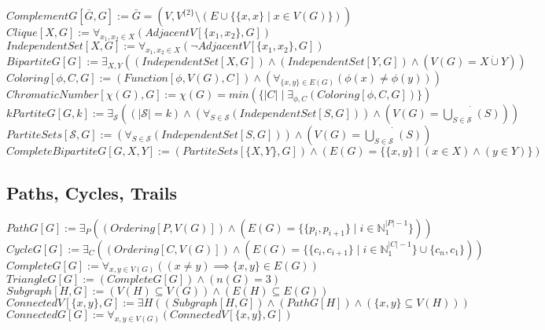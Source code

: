 \documentclass{book}
\newcommand{\abr}{:=}
\newcommand{\st}{\mathbin{|}}
\newcommand{\utup}[1]{\{#1\}}
\begin{document}
$ComplementG[\bar{G}, G] \abr \bar{G} = (V, V^{\{2\}} \setminus (E \cup \{\utup{x, x} \st x \in V(G)\}))$ \\
$Clique[X, G] \abr \forall_{x_1, x_2 \in X}(AdjacentV[\utup{x_1, x_2}, G])$ \\
$IndependentSet[X, G] \abr \forall_{x_1, x_2 \in X}(\lnot AdjacentV[\utup{x_1, x_2}, G])$ \\
$BipartiteG[G] \abr \exists_{X, Y}((IndependentSet[X, G]) \land (IndependentSet[Y, G]) \land (V(G) = X \dot{\cup} Y))$ \\
$Coloring[\phi, C, G] \abr (Function[\phi, V(G), C]) \land (\forall_{\utup{x, y} \in E(G)}(\phi(x) \neq \phi(y)))$ \\
$ChromaticNumber[\chi(G), G] \abr \chi(G) = min(\{|C| \st \exists_{\phi, C}(Coloring[\phi, C, G])\})$ \\
$kPartiteG[G, k] \abr \exists_{\mathcal{S}}((|\mathcal{S}| = k) \land (\forall_{S \in \mathcal{S}}(IndependentSet[S, G])) \land (V(G) = \dot{\bigcup \limits_{S \in \mathcal{S}}^{}}(S)))$ \\
$PartiteSets[\mathcal{S}, G] \abr (\forall_{S \in \mathcal{S}}(IndependentSet[S, G])) \land (V(G) = \dot{\bigcup \limits_{S \in \mathcal{S}}^{}}(S))$ \\
$CompleteBipartiteG[G, X, Y] \abr (PartiteSets[\{X, Y\}, G]) \land (E(G) = \{\utup{x, y} \st (x \in X) \land (y \in Y)\})$ \\


\subsection{Paths, Cycles, Trails}
$PathG[G] \abr \exists_{P}((Ordering[P, V(G)]) \land (E(G) = \{\utup{p_i, p_{i + 1}} \st i \in \mathbb{N}_1^{|P| - 1}\}))$ \\
$CycleG[G] \abr \exists_{C}((Ordering[C, V(G)]) \land (E(G) = \{\utup{c_i, c_{i + 1}} \st i \in \mathbb{N}_1^{|C| - 1}\} \cup \{c_n, c_1\}))$ \\
$CompleteG[G] \abr \forall_{x, y \in V(G)}((x \neq y) \implies \utup{x, y} \in E(G))$ \\
$TriangleG[G] \abr (CompleteG[G]) \land (n(G) = 3)$ \\

$Subgraph[H, G] \abr (V(H) \subseteq V(G)) \land (E(H) \subseteq E(G))$ \\
$ConnectedV[\{x, y\}, G] \abr \exists{H}((Subgraph[H, G]) \land (PathG[H]) \land (\{x, y\} \subseteq V(H)))$ \\
$ConnectedG[G] \abr \forall_{x, y \in V(G)}(ConnectedV[\{x, y\}, G])$ \\
\end{document}
